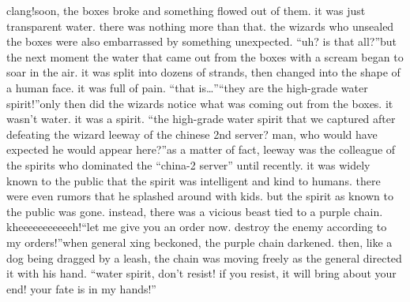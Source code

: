 clang!soon, the boxes broke and something flowed out of them.
 it was just transparent water.
there was nothing more than that.
 the wizards who unsealed the boxes were also embarrassed by something unexpected.
“uh? is that all?”but the next moment the water that came out from the boxes with a scream began to soar in the air.
 it was split into dozens of strands, then changed into the shape of a human face.
 it was full of pain.
“that is…”“they are the high-grade water spirit!”only then did the wizards notice what was coming out from the boxes.
 it wasn’t water.
 it was a spirit.
“the high-grade water spirit that we captured after defeating the wizard leeway of the chinese 2nd server? man, who would have expected he would appear here?”as a matter of fact, leeway was the colleague of the spirits who dominated the “china-2 server” until recently.
 it was widely known to the public that the spirit was intelligent and kind to humans.
 there were even rumors that he splashed around with kids.
 but the spirit as known to the public was gone.
 instead, there was a vicious beast tied to a purple chain.
kheeeeeeeeeeeh!“let me give you an order now.
 destroy the enemy according to my orders!”when general xing beckoned, the purple chain darkened.
 then, like a dog being dragged by a leash, the chain was moving freely as the general directed it with his hand.
“water spirit, don’t resist! if you resist, it will bring about your end! your fate is in my hands!”

 